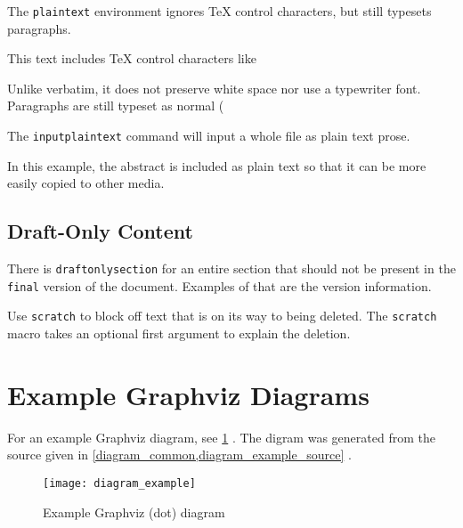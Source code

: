 The \lstinline{plaintext} environment ignores TeX control characters,
but still typesets paragraphs.

\begin{plaintext}
    This text includes TeX control characters like %

    Unlike verbatim, it does not preserve white space nor use a typewriter font.
    Paragraphs are still
    typeset as normal (%
\end{plaintext}

The \lstinline{inputplaintext} command will input a whole file as plain text prose.

In this example, the abstract is included as plain text so that it can be more easily copied to other media.



\subsection{Draft-Only Content}

There is \lstinline{draftonlysection} for an entire section that should not be present in the \lstinline{final} version of the document.
Examples of that are the version information.

Use \lstinline{scratch} to block off text that is on its way to being deleted.
The \lstinline{scratch} macro takes an optional first argument to explain the deletion.




\section{Example Graphviz Diagrams}

For an example Graphviz diagram, see
\cref{diagram_example}%
.
The digram was generated from the source given in
\cref{diagram_common,diagram_example_source}%
.

\begin{figure}[h]
    \centering
    \texttt{[image: diagram\_example]}
    \caption{Example Graphviz (dot) diagram}
    \label{diagram_example}
\end{figure}

